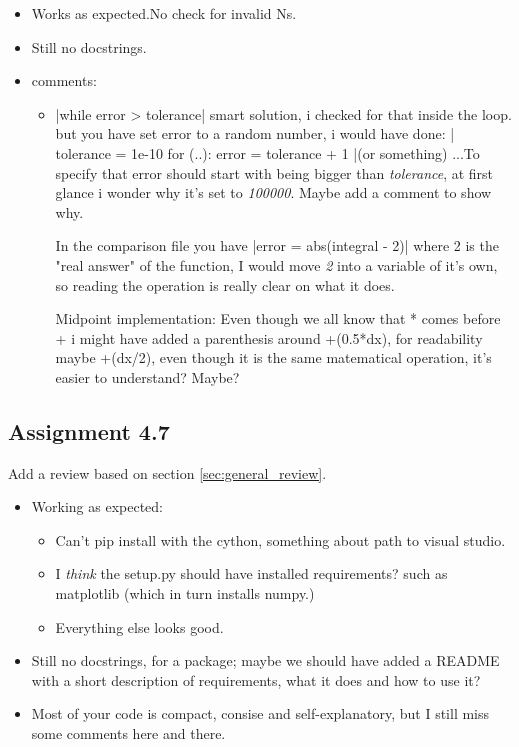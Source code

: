 \documentclass[a4paper]{article}
\begin{document}
\begin{itemize}
\item Works as expected.No check for invalid Ns.
\item Still no docstrings.
  
\item comments:
\begin{itemize}
\item 
{}|while error > tolerance| smart solution, i checked for that inside the loop.
but you have set error to a random number, i would have done:
|
tolerance = 1e-10
for (..):
	error = tolerance + 1 |(or something)
...To specify that error should start with being bigger than \emph{tolerance}, 
at first glance i wonder why it's set to \emph{100000}.
Maybe add a comment to show why.


In the comparison file you have 
|error = abs(integral - 2)|
where 2 is the "real answer" of the function, I would move \emph{2} into a variable of it's own, so reading the operation is really clear on what it does.


Midpoint implementation:
Even though we all know that * comes before +
i might have added a parenthesis around +(0.5*dx), for readability maybe 
+(dx/2), even though it is the same matematical operation, it's easier to understand? Maybe?
\end{itemize}
  
\end{itemize}




\subsection*{Assignment 4.7}
Add a review based on section \ref{sec:general_review}.

\begin{itemize}
\item Working as expected:
\begin{itemize}
\item Can't pip install with the cython, something about path to visual studio.
\item I \textit{think} the setup.py should have installed requirements? such as matplotlib (which in turn installs numpy.)
\item Everything else looks good.
\end{itemize} 

\item Still no docstrings, for a package; maybe we should have added a README with a short description of requirements, what it does and how to use it?

  \item Most of your code is compact, consise and self-explanatory, but I still miss some comments here and there.
  
\end{itemize}
\end{document}
